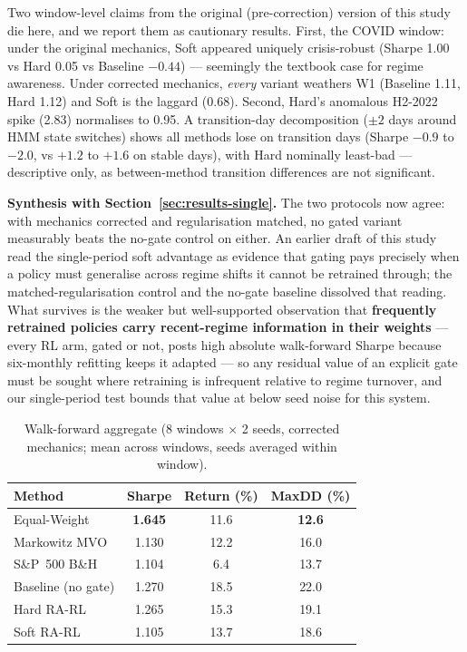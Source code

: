 \documentclass[sigconf,anonymous,review]{acmart}
\begin{document}
Two window-level claims from the original (pre-correction) version of
this study die here, and we report them as cautionary results. First,
the COVID window: under the original mechanics, Soft appeared uniquely
crisis-robust (Sharpe 1.00 vs Hard 0.05 vs Baseline $-0.44$) ---
seemingly the textbook case for regime awareness. Under corrected
mechanics, \emph{every} variant weathers W1 (Baseline 1.11, Hard 1.12)
and Soft is the laggard (0.68). Second, Hard's anomalous H2-2022 spike
(2.83) normalises to 0.95. A transition-day decomposition ($\pm2$ days
around HMM state switches) shows all methods lose on transition days
(Sharpe $-0.9$ to $-2.0$, vs $+1.2$ to $+1.6$ on stable days), with
Hard nominally least-bad --- descriptive only, as between-method
transition differences are not significant.

\textbf{Synthesis with Section~\ref{sec:results-single}.} The two
protocols now agree: with mechanics corrected and regularisation
matched, no gated variant measurably beats the no-gate control on
either. An earlier draft of this study read the single-period soft
advantage as evidence that gating pays precisely when a policy must
generalise across regime shifts it cannot be retrained through; the
matched-regularisation control and the no-gate baseline dissolved that
reading. What survives is the weaker but well-supported observation
that \textbf{frequently retrained policies carry recent-regime
information in their weights} --- every RL arm, gated or not, posts
high absolute walk-forward Sharpe because six-monthly refitting keeps
it adapted --- so any residual value of an explicit gate must be sought
where retraining is infrequent relative to regime turnover, and our
single-period test bounds that value at below seed noise for this
system.

\begin{table}[t]
\caption{Walk-forward aggregate (8 windows $\times$ 2 seeds, corrected
mechanics; mean across windows, seeds averaged within window).}
\label{tab:wf}
\begin{tabular}{lccc}
\toprule
Method & Sharpe & Return (\%) & MaxDD (\%) \\
\midrule
Equal-Weight        & \textbf{1.645} & 11.6 & \textbf{12.6} \\
Markowitz MVO       & 1.130 & 12.2 & 16.0 \\
S\&P~500 B\&H       & 1.104 & 6.4  & 13.7 \\
Baseline (no gate)  & 1.270 & 18.5 & 22.0 \\
Hard RA-RL          & 1.265 & 15.3 & 19.1 \\
Soft RA-RL          & 1.105 & 13.7 & 18.6 \\
\bottomrule
\end{tabular}
\end{table}
\end{document}
